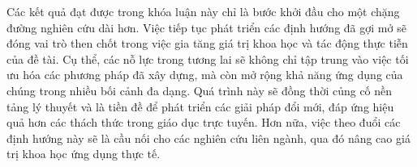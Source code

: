 Các kết quả đạt được trong khóa luận này chỉ là bước khởi đầu cho một chặng đường nghiên cứu dài hơn. Việc tiếp tục phát triển các định hướng đã gợi mở sẽ đóng vai trò then chốt trong việc gia tăng giá trị khoa học và tác động thực tiễn của đề tài. Cụ thể, các nỗ lực trong tương lai sẽ không chỉ tập trung vào việc tối ưu hóa các phương pháp đã xây dựng, mà còn mở rộng khả năng ứng dụng của chúng trong nhiều bối cảnh đa dạng. Quá trình này sẽ đồng thời củng cố nền tảng lý thuyết và là tiền đề để phát triển các giải pháp đổi mới, đáp ứng hiệu quả hơn các thách thức trong giáo dục trực tuyến. Hơn nữa, việc theo đuổi các định hướng này sẽ là cầu nối cho các nghiên cứu liên ngành, qua đó nâng cao giá trị khoa học ứng dụng thực tế.
